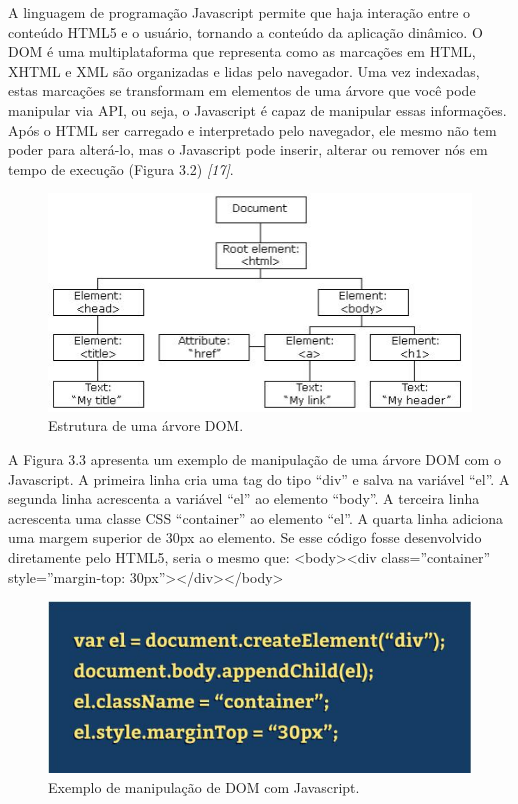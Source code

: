 \documentclass[
  12pt,				%
  openany,
  oneside,
  a4paper,			%
  english,			%
  brazil
]{article}
\numberwithin{figure}{section}
\numberwithin{table}{section}
\begin{document}
A linguagem de programação Javascript permite que haja interação entre o conteúdo HTML5 e o usuário, tornando a conteúdo da aplicação dinâmico. O DOM é uma multiplataforma que representa como as marcações em HTML, XHTML e XML são organizadas e lidas pelo navegador. Uma vez indexadas, estas marcações se transformam em elementos de uma árvore que você pode manipular via API, ou seja, o Javascript é capaz de manipular essas informações. Após o HTML ser carregado e interpretado pelo navegador, ele mesmo não tem poder para alterá-lo, mas o Javascript pode inserir, alterar ou remover nós em tempo de execução (Figura 3.2) \textit{[17]}.

\begin{figure}[!htb]
\centering
\includegraphics[width=1\textwidth]{figura32}
\caption{Estrutura de uma árvore DOM.}
\end{figure}

A Figura 3.3 apresenta um exemplo de manipulação de uma árvore DOM com o Javascript. A primeira linha cria uma tag do tipo “div” e salva na variável “el”. A segunda linha acrescenta a variável “el” ao elemento “body”. A terceira linha acrescenta uma classe CSS
“container” ao elemento “el”. A quarta linha adiciona uma margem superior de 30px ao elemento.
Se esse código fosse desenvolvido diretamente pelo HTML5, seria o mesmo que:
<body><div class=”container” style=”margin-top: 30px”></div></body>

\begin{figure}[!htb]
\centering
\includegraphics[width=1\textwidth]{figura33}
\caption{Exemplo de manipulação de DOM com Javascript.}
\end{figure}
\end{document}
